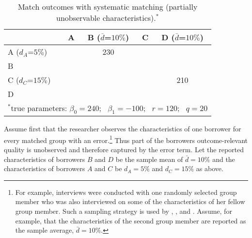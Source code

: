 \begin{table}[htbp!]
\small
  \begin{center}
    \begin{minipage}[c]{0.35\linewidth}
      \caption{Match outcomes with systematic matching (partially unobservable characteristics).$^*$}
      \label{Tab:Match outcomes with systematic matching partially unobservable characteristics}
    \end{minipage} \hfill
    \begin{minipage}[c]{0.6\linewidth}
\centering 
\begin{tabular}{l||cccc}
	& \multicolumn{1}{|c|}{A} & \multicolumn{1}{|c|}{B ($\bar d$=$10\%$)} & \multicolumn{1}{|c|}{C} & \multicolumn{1}{|c|}{D ($\bar d$=$10\%$)} \\
\hline \hline
A ($d_A$=$5\%$) && \multicolumn{1}{|c|}{230} & \multicolumn{1}{|c|}{} & \multicolumn{1}{|c|}{} \\
\cline{3-5} \cline{1-1}
B & && \multicolumn{1}{|c|}{} & \multicolumn{1}{|c|}{} \\
\cline{4-5} \cline{1-1}
C ($d_C$=$15\%$) && & & \multicolumn{1}{|c|}{210}\\
\cline{5-5} \cline{1-1}
D && & &\\
\cline{1-1}
\multicolumn{5}{l}{\footnotesize $^*$true parameters: $\beta_0=240$; \ $\beta_1=-100$; \ $r=120$; \ $q=20$}
\end{tabular}
    \end{minipage}
  \end{center}
\end{table}


Assume first that the researcher observes the characteristics of one borrower for every matched group with an error.\footnote{For example, interviews were conducted with one randomly selected group member who was also interviewed on some of the characteristics of her fellow group member. Such a sampling strategy is used by \citet{Carpenter2000}, \citet{Lensink2003}, and \citet{Ahlin2007}. Assume, for example, that the characteristics of the second group member are reported as the sample average, $\bar d=10\%$.} Thus part of the borrowers outcome-relevant quality is unobserved and therefore captured by the error term. Let the reported characteristics of borrowers $B$ and $D$ be the sample mean of $\bar d=10\%$ and the characteristics of borrowers $A$ and $C$ be $d_A=5\%$ and $d_C=15\%$ as above.

